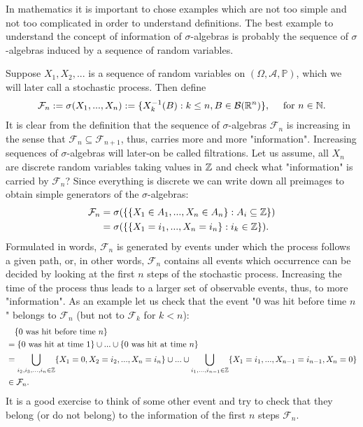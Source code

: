 	 
	In mathematics it is important to chose examples which are not too simple and not too complicated in order to understand definitions. The best example to understand the concept of information of $\sigma$-algebras is probably the sequence of $\sigma$-algebras induced by a sequence of random variables. 
\begin{example}	
	Suppose $X_1,X_2,...$ is a sequence of random variables on $(\Omega, \mathcal A, \mathbb P)$, which we will later call a stochastic process. Then define
	\begin{align*}
		\mathcal F_n:=	\sigma(X_1,...,X_n):=\{ X_k^{-1}(B) : k\leq n,B\in \mathcal B(\mathbb{R}^n)\},\quad \text{ for }n\in\mathbb{N}.
	\end{align*}	
	It is clear from the definition that the sequence of $\sigma$-algebras $\mathcal F_n$ is increasing in the sense that $\mathcal F_n\subseteq \mathcal F_{n+1}$, thus, carries more and more "{}information"{}. Increasing sequences of $\sigma$-algebras will later-on be called filtrations. Let us assume, all $X_n$ are discrete random variables taking values in $\mathbb{Z}$ and check what "{}information"{} is carried by $\mathcal F_n$? Since everything is discrete we can write down all preimages to obtain simple generators of the $\sigma$-algebras:
		\begin{align*}
		\mathcal F_n
		&=\sigma(\{ \{X_1 \in A_1, ..., X_n \in A_n \} : A_i\subseteq \mathbb{Z} \})\\
		&=\sigma(\{\{X_1=i_1,..., X_n=i_n\}: i_k\in \mathbb{Z} \}).
	\end{align*}	
	Formulated in words, $\mathcal F_n$ is generated by events under which the process follows a given path, or, in other words, $\mathcal F_n$ contains all events which occurrence can be decided by looking at the first $n$ steps of the stochastic process. Increasing the time of the process thus leads to a larger set of observable events, thus, to more "{}information"{}. As an example let us check that the event "{}$0$ was hit before time $n$"{} belongs to $\mathcal F_n$ (but not to $\mathcal F_k$ for $k<n$):
	\begin{align*}
		&\quad \{0\text{ was hit before time }n\}\\
		&=\{0\text{ was hit at time }1\}\cup...\cup \{0\text{ was hit at time }n\}\\
		&= \bigcup_{i_2,i_3,...,i_n\in \mathbb{Z}} \{X_1= 0, X_2=i_2,..., X_n=i_n\}
		 \cup...\cup \bigcup_{i_1,...,i_{n-1} \in\mathbb{Z}} \{X_1= i_1, ..., X_{n-1}=i_{n-1},X_n=0 \}\\
		&\in \mathcal F_n.
	\end{align*}
	It is a good exercise to think of some other event and try to check that they belong (or do not belong) to the information of the first $n$ steps $\mathcal F_n$.
	
\end{example}
